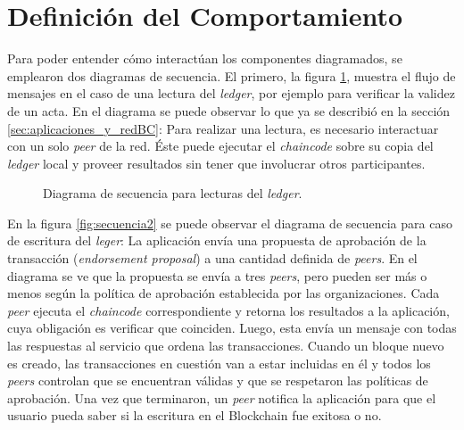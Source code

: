 \section{Definición del Comportamiento}
Para poder entender cómo interactúan los componentes diagramados, se emplearon dos diagramas de secuencia. El primero, la figura \ref{fig:secuencia1}, muestra el flujo de mensajes en el caso de una lectura del \textit{ledger}, por ejemplo para verificar la validez de un acta. En el diagrama se puede observar lo que ya se describió en la sección \ref{sec:aplicaciones_y_redBC}: Para realizar una lectura, es necesario interactuar con un solo \textit{peer} de la red. Éste puede ejecutar el \textit{chaincode} sobre su copia del \textit{ledger} local y proveer resultados sin tener que involucrar otros participantes.

\begin{figure}
    \caption{Diagrama de secuencia para lecturas del \textit{ledger}.}
    \label{fig:secuencia1}
\end{figure}

En la figura \ref{fig:secuencia2} se puede observar el diagrama de secuencia para caso de escritura del \textit{leger}: La aplicación envía una propuesta de aprobación de la transacción (\textit{endorsement proposal}) a una cantidad definida de \textit{peers}. En el diagrama se ve que la propuesta se envía a tres \textit{peers}, pero pueden ser más o menos según la política de aprobación establecida por las organizaciones. Cada \textit{peer} ejecuta el \textit{chaincode} correspondiente y retorna los resultados a la aplicación, cuya obligación es verificar que coinciden. Luego, esta envía un mensaje con todas las respuestas al servicio que ordena las transacciones. Cuando un bloque nuevo es creado, las transacciones en cuestión van a estar incluidas en él y todos los \textit{peers} controlan que se encuentran válidas y que se respetaron las políticas de aprobación. Una vez que terminaron, un \textit{peer} notifica la aplicación para que el usuario pueda saber si la escritura en el Blockchain fue exitosa o no.

